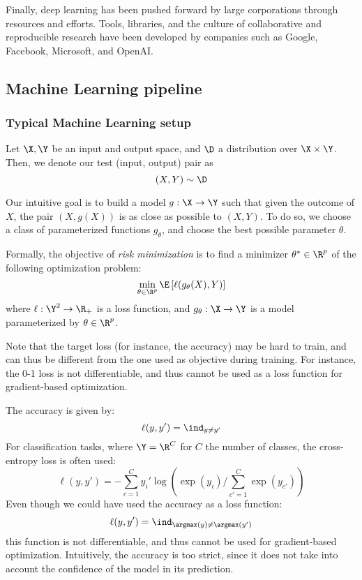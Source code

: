 Finally, deep learning has been pushed forward by large corporations through resources and efforts. Tools, libraries, and the culture of collaborative and reproducible research have been developed by companies such as Google, Facebook, Microsoft, and OpenAI.

\subsection{Machine Learning pipeline}
\subsubsection{Typical Machine Learning setup}
Let $\X, \Y$ be an input and output space, and $\D$ a distribution over $\X\times\Y$. Then, we denote our test (input, output) pair as
\begin{equation*}
    (X, Y) \sim \D
\end{equation*}

Our intuitive goal is to build a model $g:\X\to\Y$ such that given the outcome of $X$, the pair $(X, g(X))$ is as close as possible to $(X, Y)$. To do so, we choose a class of parameterized functions $g_\theta$, and choose the best possible parameter $\theta$.

Formally, the objective of \emph{risk minimization} is to find a minimizer $\theta^*\in\R^p$ of the following optimization problem:
\begin{equation*}
    \min_{\theta\in\R^p} \E\left[\ell(g_\theta(X), Y)\right]
\end{equation*}
where $\ell:\Y^2\to\R_+$ is a loss function, and $g_\theta:\X\to\Y$ is a model parameterized by $\theta\in\R^p$.

Note that the target loss (for instance, the accuracy) may be hard to train, and can thus be different from the one used as objective during training. For instance, the 0-1 loss is not differentiable, and thus cannot be used as a loss function for gradient-based optimization.

The accuracy is given by:
\begin{equation*}
    \ell(y, y') = \ind_{y\neq y'}
\end{equation*}
For classification tasks, where $\Y=\R^C$ for $C$ the number of classes, the cross-entropy loss is often used:
\begin{equation*}
    \ell(y, y') = -\sum_{c=1}^C y_i' \log\left(\exp(y_i) / \sum_{c'=1}^C \exp(y_{c'})\right)
\end{equation*}
Even though we could have used the accuracy as a loss function:
\begin{equation*}
    \ell(y, y') = \ind_{\argmax(y) \neq \argmax(y')}
\end{equation*}
this function is not differentiable, and thus cannot be used for gradient-based optimization. Intuitively, the accuracy is too strict, since it does not take into account the confidence of the model in its prediction.

